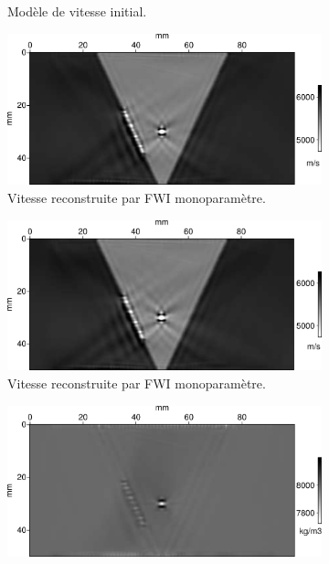 \begin{figure}[p]
\begin{changemargin}{-2cm}{-2cm}
\begin{subfigure}[b]{0.29\textwidth}
			\caption{Modèle de vitesse initial.}
		\end{subfigure}
		\begin{subfigure}[b]{0.29\textwidth}
			\includegraphics[width=\textwidth]{img/mono_param/vp_final_uni.png}
			\caption{Vitesse reconstruite par FWI monoparamètre.}
		\end{subfigure}
		\begin{subfigure}[b]{0.29\textwidth}
			\includegraphics[width=\textwidth]{img/mono_param/vp_final_smooth.png}
			\caption{Vitesse reconstruite par FWI monoparamètre.}
		\end{subfigure}
		\begin{subfigure}[b]{0.29\textwidth}
			\includegraphics[width=\textwidth]{img/mono_param/rho_mono.png}

\end{subfigure}
\end{changemargin}
\end{figure}
